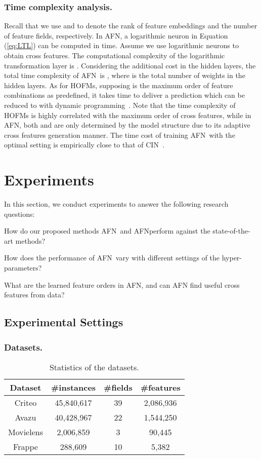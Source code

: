 \documentclass[letterpaper]{article} \usepackage{aaai20}  \usepackage{times}  \usepackage{helvet} \usepackage{courier}  \usepackage[hyphens]{url}  \usepackage{graphicx} \urlstyle{rm} \def\UrlFont{\rm}  \usepackage{graphicx}  \frenchspacing  \setlength{\pdfpagewidth}{8.5in}  \setlength{\pdfpageheight}{11in}
\newcommand{\model}{{AFN}~}
\newcommand{\modelns}{{AFN}}
\begin{document}
\subsubsection{Time complexity analysis.}
Recall that we use  and  to denote the rank of feature embeddings and the number of feature fields, respectively. 
In \modelns, a logarithmic neuron in Equation (\ref{eq:LTL}) can be computed in  time. Assume we use  logarithmic neurons to obtain cross features. The computational complexity of the logarithmic transformation layer is . Considering the additional cost in the hidden layers, the total time complexity of \model is , where  is the total number of weights in the hidden layers.
As for HOFMs, supposing  is the maximum order of feature combinations as predefined, it takes  time to deliver a prediction which can be reduced to
 with dynamic programming~\cite{hofm}. 
Note that the time complexity of HOFMs is highly correlated with the maximum order  of cross features, while in \modelns, both  and  are only determined by the model structure due to its adaptive cross features generation manner. The time cost of training \model with the optimal setting is empirically close to that of CIN~\cite{xDeepFM}.

\section{Experiments}

In this section, we conduct experiments to answer the following research questions:

 How do our proposed methods \model and \modelns perform against the state-of-the-art methods?

 How does the performance of \model vary with different settings of the hyper-parameters?

 What are the learned feature orders in \modelns, and can AFN find useful cross features from data?

\subsection{Experimental Settings}

\subsubsection{Datasets.}
\begin{table}
\small
	\captionsetup{labelfont=bf}
	\centering
		\caption{Statistics of the datasets.}
			\label{tab:datasets}
	\begin{tabular}{cccc}
		\toprule[1pt]
		Dataset&\!\#instances\!&\!\#fields\!&\!\#features\!\\
		\midrule[0.5pt] 
		Criteo&45,840,617&39&2,086,936\\
		Avazu&40,428,967&22&1,544,250\\
		Movielens&2,006,859&3&90,445\\
		Frappe&288,609&10&5,382\\
		\bottomrule[1pt]
	\end{tabular}
\end{table}
\end{document}
